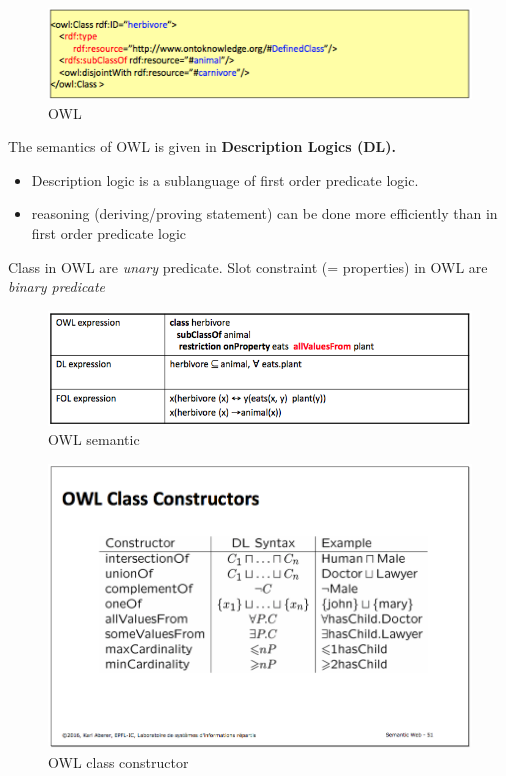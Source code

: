 \begin{figure}[H]
\begin{center}
\includegraphics[width=\textwidth]{figures/owl.png}
\end{center}
\caption{OWL}
\end{figure}

The semantics of OWL is given in \bf{Description Logics (DL)}. 
\begin{itemize}
	\item Description logic is a sublanguage of first order predicate logic. 
	\item reasoning (deriving/proving statement) can be done more efficiently than in first order predicate logic
\end{itemize}



Class in OWL are \textit{unary} predicate. Slot constraint (= properties) in OWL are \textit{binary predicate}

\begin{figure}[H]
\begin{center}
\includegraphics[width=\textwidth]{figures/semantic_owl.png}
\end{center}
\caption{OWL semantic}
\end{figure}

\begin{figure}[H]
\begin{center}
\includegraphics[width=\textwidth]{figures/owl_class.png}
\end{center}
\caption{OWL class constructor}
\end{figure}

